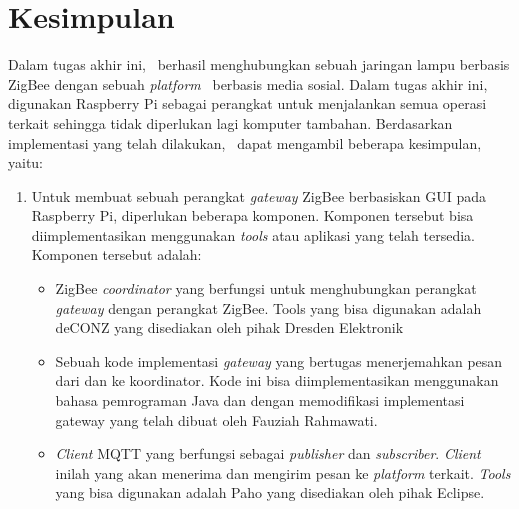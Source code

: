 \section{Kesimpulan}
Dalam tugas akhir ini, \saya~berhasil menghubungkan sebuah jaringan lampu berbasis ZigBee dengan sebuah \textit{platform} \iot~berbasis media sosial. Dalam tugas akhir ini, digunakan Raspberry Pi sebagai perangkat untuk menjalankan semua operasi terkait sehingga tidak diperlukan lagi komputer tambahan. Berdasarkan implementasi yang telah dilakukan, \saya~dapat mengambil beberapa kesimpulan, yaitu:
\begin{enumerate}
	\item Untuk membuat sebuah perangkat \textit{gateway} ZigBee berbasiskan GUI pada Raspberry Pi, diperlukan beberapa komponen. Komponen tersebut bisa diimplementasikan menggunakan \textit{tools} atau aplikasi yang telah tersedia. Komponen tersebut adalah:
	\begin{itemize}
	\item ZigBee \textit{coordinator} yang berfungsi untuk menghubungkan perangkat \textit{gateway} dengan perangkat ZigBee. Tools yang bisa digunakan adalah deCONZ yang disediakan oleh pihak Dresden Elektronik
	\item Sebuah kode implementasi \textit{gateway} yang bertugas menerjemahkan pesan dari dan ke koordinator. Kode ini bisa diimplementasikan menggunakan bahasa pemrograman Java dan dengan memodifikasi implementasi gateway yang telah dibuat oleh Fauziah Rahmawati\cite{SkripsiFarah}.
	\item \textit{Client} MQTT yang berfungsi sebagai \textit{publisher} dan \textit{subscriber}. \textit{Client} inilah yang akan menerima dan mengirim pesan ke \textit{platform} terkait. \textit{Tools} yang bisa digunakan adalah Paho yang disediakan oleh pihak Eclipse.

\end{itemize}
\end{enumerate}
